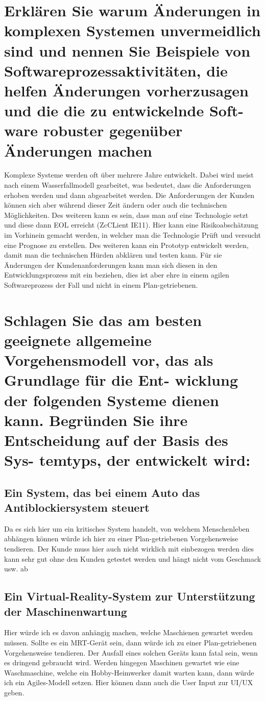 \documentclass[12pt]{article}
\begin{document}
\section{Erklären Sie warum Änderungen in komplexen Systemen unvermeidlich sind und nennen Sie Beispiele
von Softwareprozessaktivitäten, die helfen Änderungen vorherzusagen und die die zu entwickelnde Soft-
ware robuster gegenüber Änderungen machen}
Komplexe Systeme werden oft über mehrere Jahre entwickelt. Dabei wird meist nach einem Wasserfallmodell gearbeitet, was bedeutet, dass die Anforderungen erhoben werden und dann abgearbeitet werden. Die Anforderungen der Kunden können sich aber während dieser Zeit ändern oder auch die technischen Möglichkeiten. Des weiteren kann es sein, dass man auf eine Technologie setzt und diese dann EOL erreicht (ZcCLient IE11). Hier kann eine Risikoabschätzung im Vorhinein gemacht werden, in welcher man die Technologie Prüft und versucht eine Prognose zu erstellen. Des weiteren kann ein Prototyp entwickelt werden, damit man die technischen Hürden abklären und testen kann. Für sie Änderungen der Kundenanforderungen kann man sich diesen in den Entwicklungsprozess mit ein beziehen, dies ist aber ehre in einem agilen Softwareprozess der Fall und nicht in einem Plan-getriebenen.
\section{Schlagen Sie das am besten geeignete allgemeine Vorgehensmodell vor, das als Grundlage für die Ent-
wicklung der folgenden Systeme dienen kann. Begründen Sie ihre Entscheidung auf der Basis des Sys-
temtyps, der entwickelt wird:}
\subsection{Ein System, das bei einem Auto das Antiblockiersystem steuert}
Da es sich hier um ein kritisches System handelt, von welchem Menschenleben abhängen können würde ich hier zu einer Plan-getriebenen Vorgehensweise tendieren. Der Kunde muss hier auch nicht wirklich mit einbezogen werden dies kann sehr gut ohne den Kunden getestet werden und hängt nicht vom Geschmack usw. ab
\subsection{Ein Virtual-Reality-System zur Unterstützung der Maschinenwartung}
Hier würde ich es davon anhängig machen, welche Maschienen gewartet werden müssen. Sollte es ein MRT-Gerät sein, dann würde ich zu einer Plan-getriebenen Vorgehensweise tendieren. Der Ausfall eines solchen Geräts kann fatal sein, wenn es dringend gebraucht wird. Werden hingegen Maschinen gewartet wie eine Waschmaschine, welche ein Hobby-Heimwerker damit warten kann, dann würde ich ein Agiles-Modell setzen. Hier können dann auch die User Input zur UI/UX geben.
\end{document}

